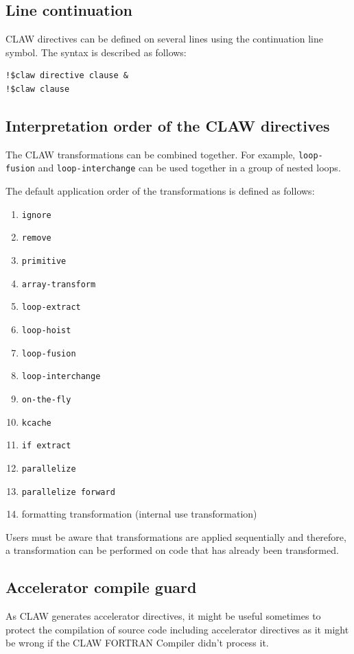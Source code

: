 \documentclass{article}
\begin{document}
\subsection{Line continuation}
CLAW directives can be defined on several lines using the continuation line
symbol. The syntax is described as follows:

\begin{lstlisting}
!$claw directive clause &
!$claw clause
\end{lstlisting}


\subsection{Interpretation order of the CLAW directives}
The CLAW transformations can be combined together. For example,
\lstinline!loop-fusion! and \lstinline!loop-interchange! can be used together
in a group of nested loops.

The default application order of the transformations is defined as follows:

\begin{enumerate}
\item \lstinline!ignore!
\item \lstinline!remove!
\item \lstinline!primitive!
\item \lstinline!array-transform!
\item \lstinline!loop-extract!
\item \lstinline!loop-hoist!
\item \lstinline!loop-fusion!
\item \lstinline!loop-interchange!
\item \lstinline!on-the-fly!
\item \lstinline!kcache!
\item \lstinline!if extract!
\item \lstinline!parallelize!
\item \lstinline!parallelize forward!
\item formatting transformation (internal use transformation)
\end{enumerate}

Users must be aware that transformations are applied sequentially and
therefore, a transformation can be performed on code that has already been
transformed.

\subsection{Accelerator compile guard}
As CLAW generates accelerator directives, it might be useful sometimes to
protect the compilation of source code including accelerator directives as it
might be wrong if the CLAW FORTRAN Compiler didn't process it.
\end{document}
